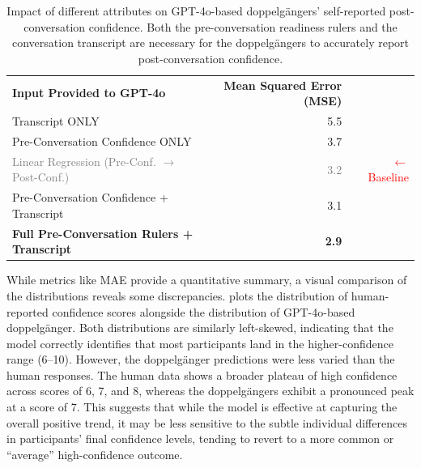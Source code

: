 \begin{table}[ht!]
	\centering
	\begin{tabular}{@{}lrr@{}}
		\cmidrule(r){1-2}
		\textbf{Input Provided to GPT-4o}                                        & \textbf{Mean Squared Error (MSE)} &                                               \\
		\cmidrule(r){1-2}
		Transcript ONLY                                                          & 5.5                               &                                               \\
		Pre-Conversation Confidence ONLY                                         & 3.7                               &                                               \\
		\textcolor{gray}{Linear Regression (Pre-Conf. $\rightarrow$ Post-Conf.)} & \textcolor{gray}{3.2}             & \textcolor{red}{\small $\leftarrow$ Baseline} \\
		Pre-Conversation Confidence + Transcript                                 & 3.1                               &                                               \\
		\textbf{Full Pre-Conversation Rulers + Transcript}                       & \textbf{2.9}                      &                                               \\
		\cmidrule(r){1-2}
	\end{tabular}
	\caption[Ablation study on doppelgängers' self-reported post-conversation confidence]{Impact of different attributes on GPT-4o-based doppelgängers' self-reported post-conversation confidence. Both the pre-conversation readiness rulers and the conversation transcript are necessary for the doppelgängers to accurately report post-conversation confidence.}
	\label{tab:ablation_results}
\end{table}

While metrics like MAE provide a quantitative summary, a visual comparison of the
distributions reveals some discrepancies.  plots the
distribution of human-reported confidence scores alongside the distribution of
GPT-4o-based doppelgänger. Both distributions are similarly left-skewed, indicating
that the model correctly identifies that most participants land in the
higher-confidence range (6--10). However, the doppelgänger predictions were less varied
than the human responses. The human data shows a broader plateau of high confidence
across scores of 6, 7, and 8, whereas the doppelgängers exhibit a pronounced peak at a
score of 7. This suggests that while the model is effective at capturing the overall
positive trend, it may be less sensitive to the subtle individual differences in
participants' final confidence levels, tending to revert to a more common or
``average'' high-confidence outcome.

